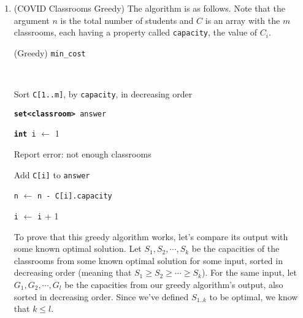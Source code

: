 \documentclass{article}
\begin{document}
\begin{enumerate}
    \pagebreak

  \item (COVID Classrooms Greedy) The algorithm is as follows. Note that the argument $n$ is the total number of students and $C$ is an array with the $m$ classrooms, each having a property called \texttt{capacity}, the value of $C_i$.

    \begin{center}
      \begin{minipage}{0.6667\linewidth}
        \renewcommand{\thealgocf}{}
        \begin{algorithm}[H]
          \caption{(Greedy) \texttt{min\_cost}}

          \texttt{\\}

          Sort \texttt{C[1..m]}, by \texttt{capacity}, in decreasing order

          \texttt{\textbf{set<classroom>} answer}

          \texttt{\textbf{int} i} $\gets$ 1

          {
            {
              Report error: not enough classrooms
            }

            Add \texttt{C[i]} to \texttt{answer}

            \texttt{n} $\gets$ \texttt{n - C[i].capacity}

            \texttt{i} $\gets$ \texttt{i} + 1
          }

        \end{algorithm}
      \end{minipage}
    \end{center}

    To prove that this greedy algorithm works, let's compare its output with some known optimal solution. Let $S_1, S_2, \cdots, S_k$ be the capacities of the classrooms from some known optimal solution for some input, sorted in decreasing order (meaning that $S_1 \ge S_2 \ge \cdots \ge S_k$). For the same input, let $G_1, G_2, \cdots, G_l$ be the capacities from our greedy algorithm's output, also sorted in decreasing order. Since we've defined $S_{1..k}$ to be optimal, we know that $k \le l$.


\end{enumerate}
\end{document}
